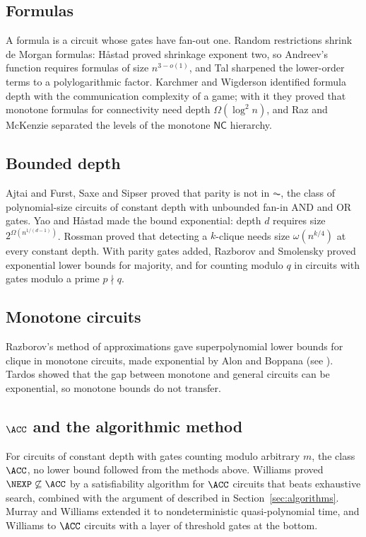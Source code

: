\subsection{Formulas}
A formula is a circuit whose gates have fan-out one. Random restrictions
shrink de Morgan formulas: H\aa stad \cite{Has98} proved shrinkage exponent
two, so Andreev's function requires formulas of size $n^{3-o(1)}$, and Tal
\cite{Tal14} sharpened the lower-order terms to a polylogarithmic factor.
Karchmer and Wigderson \cite{KW90} identified formula depth with the
communication complexity of a game; with it they proved that monotone formulas
for connectivity need depth $\Omega(\log^2 n)$, and Raz and McKenzie
\cite{RM99} separated the levels of the monotone $\mathsf{NC}$ hierarchy.

\subsection{Bounded depth}
Ajtai \cite{Ajt83} and Furst, Saxe and Sipser \cite{FSS84} proved that parity is
not in $\AC$, the class of polynomial-size circuits of constant depth with
unbounded fan-in AND and OR gates. Yao \cite{Yao85} and H\aa stad \cite{Has86}
made the bound exponential: depth $d$ requires size $2^{\Omega(n^{1/(d-1)})}$.
Rossman \cite{Ros08} proved that detecting a $k$-clique needs size
$\omega(n^{k/4})$ at every constant depth. With parity gates added, Razborov
\cite{Raz87} and Smolensky \cite{Smo87} proved exponential lower bounds for
majority, and for counting modulo $q$ in circuits with gates modulo a prime
$p\nmid q$.

\subsection{Monotone circuits}
Razborov's method of approximations gave superpolynomial lower bounds for
clique in monotone circuits, made exponential by Alon and Boppana \cite{AB87}
(see \cite[Chapter 9]{Juk12}). Tardos \cite{Tar88} showed that the gap between
monotone and general circuits can be exponential, so monotone bounds do not
transfer.

\subsection{$\ACC$ and the algorithmic method}
For circuits of constant depth with gates counting modulo arbitrary $m$, the
class $\ACC$, no lower bound followed from the methods above. Williams
\cite{Wil14} proved $\NEXP\not\subseteq\ACC$ by a satisfiability algorithm for
$\ACC$ circuits that beats exhaustive search, combined with the argument of
\cite{Wil13} described in Section~\ref{sec:algorithms}. Murray and Williams
\cite{MW20} extended it to nondeterministic quasi-polynomial time, and
Williams \cite{Wil14b} to $\ACC$ circuits with a layer of threshold gates at the
bottom.

